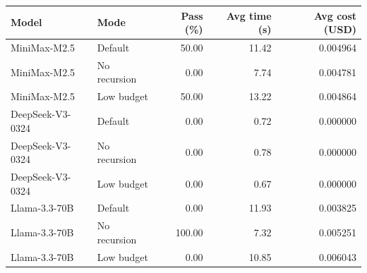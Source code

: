 \begin{tabular}{llrrr}
\toprule
Model & Mode & Pass (\%) & Avg time (s) & Avg cost (USD) \\
\midrule
MiniMax-M2.5 & Default & 50.00 & 11.42 & 0.004964 \\
MiniMax-M2.5 & No recursion & 0.00 & 7.74 & 0.004781 \\
MiniMax-M2.5 & Low budget & 50.00 & 13.22 & 0.004864 \\
DeepSeek-V3-0324 & Default & 0.00 & 0.72 & 0.000000 \\
DeepSeek-V3-0324 & No recursion & 0.00 & 0.78 & 0.000000 \\
DeepSeek-V3-0324 & Low budget & 0.00 & 0.67 & 0.000000 \\
Llama-3.3-70B & Default & 0.00 & 11.93 & 0.003825 \\
Llama-3.3-70B & No recursion & 100.00 & 7.32 & 0.005251 \\
Llama-3.3-70B & Low budget & 0.00 & 10.85 & 0.006043 \\
\bottomrule
\end{tabular}
